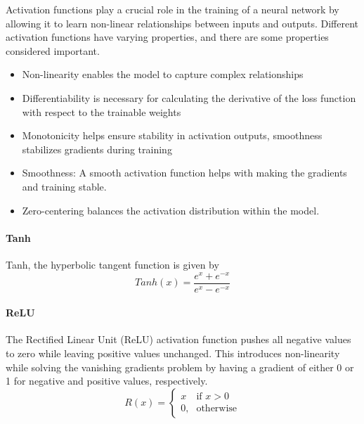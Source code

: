 Activation functions play a crucial role in the training of a neural network by allowing it to learn non-linear relationships between inputs and outputs.
Different activation functions have varying properties, and there are some properties considered important.

\begin{itemize}
    \item Non-linearity enables the model to capture complex relationships
    \item Differentiability is necessary for calculating the derivative of the loss function with respect to the trainable weights
    \item Monotonicity helps ensure stability in activation outputs, smoothness stabilizes gradients during training
    \item Smoothness: A smooth activation function helps with making the gradients and training stable.
    \item Zero-centering balances the activation distribution within the model.
\end{itemize}

\paragraph{Tanh}
Tanh, the hyperbolic tangent function is given by
\begin{equation}\label{eq:tanh}
    Tanh(x) = \frac{e^x+e^{-x}}{e^x-e^{-x}}
\end{equation}

\paragraph{ReLU}
The Rectified Linear Unit (ReLU) activation function pushes all negative values to zero while leaving positive values unchanged.
This introduces non-linearity while solving the vanishing gradients problem by having a gradient of either 0 or 1 for negative and positive values, respectively.
\begin{equation}\label{eq:relu}
    R(x) = \begin{cases} x & \mbox{if } x > 0 \\ \mbox{0,} & \mbox{otherwise} \end{cases}
\end{equation}




